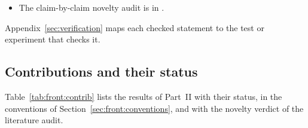 \begin{itemize}
    which small starts freeze the signs and the law is an exponentiated gradient whose limit is the Bregman projection
    onto the sign-constrained least-squares fits (Proposition D$'''$.47), and the rich transit, in which from small
    masses the kernels enter one at a time along an inverse scale space flow and, with the paradigm's moving centres,
    slide onto the target's features, one kernel per feature (Proposition D$'''$.48) --- through a seventeenth to a
    thirty-seventh. Every confirmed issue and its fix is logged in , and the raw reports of
    rounds 1--3, 5--33 and 35--37 are kept beside it.
  \item The claim-by-claim novelty audit is in .
\end{itemize}
Appendix~\ref{sec:verification} maps each checked statement to the test or experiment that checks it.

\subsection{Contributions and their status}

Table~\ref{tab:front:contrib} lists the results of Part~II with their status, in the conventions of
Section~\ref{sec:front:conventions}, and with the novelty verdict of the literature audit.

